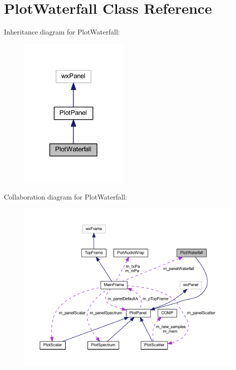 \hypertarget{class_plot_waterfall}{\section{Plot\-Waterfall Class Reference}
\label{class_plot_waterfall}
}


Inheritance diagram for Plot\-Waterfall\-:\nopagebreak
\begin{figure}[H]
\begin{center}
\leavevmode
\includegraphics[width=152pt]{class_plot_waterfall__inherit__graph}
\end{center}
\end{figure}


Collaboration diagram for Plot\-Waterfall\-:\nopagebreak
\begin{figure}[H]
\begin{center}
\leavevmode
\includegraphics[width=350pt]{class_plot_waterfall__coll__graph}
\end{center}
\end{figure}
